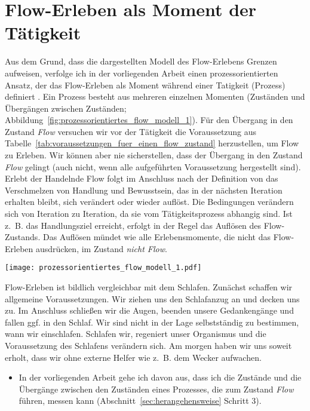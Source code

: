 

\section{Flow-Erleben als Moment der Tätigkeit} 

\label{sec:flow_erleben_als_moment_der_tatigkeit}

Aus dem Grund, dass die dargestellten Modell des Flow-Erlebens Grenzen aufweisen, verfolge ich in der vorliegenden Arbeit einen prozessorientierten Ansatz, der das Flow-Erleben als Moment während einer Tatigkeit (Prozess) definiert \citep[][S.~2]{Grueter2006}. Ein Prozess besteht aus mehreren einzelnen Momenten (Zuständen und Übergängen zwischen Zuständen; Abbildung~\ref{fig:prozessorientiertes_flow_modell_1}). Für den Übergang in den Zustand \emph{Flow} versuchen wir vor der Tätigkeit die Voraussetzung aus Tabelle~\ref{tab:voraussetzungen_fuer_einen_flow_zustand} herzustellen, um Flow zu Erleben. Wir können aber nie sicherstellen, dass der Übergang in den Zustand \emph{Flow} gelingt (auch nicht, wenn alle aufgeführten Voraussetzung hergestellt sind). Erlebt der Handelnde Flow folgt im Anschluss nach der Definition von \citet{Henk2014} das Verschmelzen von Handlung und Bewusstsein, das in der nächsten Iteration erhalten bleibt, sich verändert oder wieder auflöst. Die Bedingungen verändern sich von Iteration zu Iteration, da sie vom Tätigkeitsprozess abhangig sind. Ist z.~B. das Handlungsziel erreicht, erfolgt in der Regel das Auflösen des Flow-Zustands. Das Auflösen mündet wie alle Erlebensmomente, die nicht das Flow-Erleben ausdrücken, im Zustand \emph{nicht Flow}. 
\begin{sidewaysfigure}
	\texttt{[image: prozessorientiertes\_flow\_modell\_1.pdf]} \caption[Prozessorientiertes Modell des Flow-Erlebens (Einführung).]{Prozessorientiertes Modell mit Auslassungen der implizit messbaren Auswirkungen des Flow-Erlebens.} \label{fig:prozessorientiertes_flow_modell_1} 
\end{sidewaysfigure}

Flow-Erleben ist bildlich vergleichbar mit dem Schlafen. Zunächst schaffen wir allgemeine Voraussetzungen. Wir ziehen uns den Schlafanzug an und decken uns zu. Im Anschluss schließen wir die Augen, beenden unsere Gedankengänge und fallen ggf. in den Schlaf. Wir sind nicht in der Lage selbstständig zu bestimmen, wann wir einschlafen. Schlafen wir, regeniert unser Organismus und die Voraussetzung des Schlafens verändern sich. Am morgen haben wir uns soweit erholt, dass wir ohne externe Helfer wie z.~B. dem Wecker aufwachen.
\begin{itemize}
	
	\item In der vorliegenden Arbeit gehe ich davon aus, dass ich die Zustände und die Übergänge zwischen den Zuständen eines Prozesses, die zum Zustand \emph{Flow} führen, messen kann (Abschnitt~\ref{sec:herangehensweise} Schritt 3).
\end{itemize}

